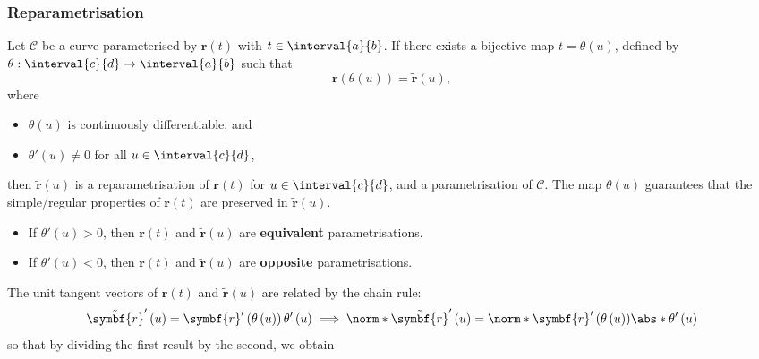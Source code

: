 \documentclass{article}
\begin{document}
\subsubsection{Reparametrisation}
Let \(\mathscr{C}\) be a curve parameterised by \(\symbf{r}\left( t
\right)\) with \(t \in \interval{a}{b}\). If there exists a bijective
map \(t = \theta\left( u \right)\), defined by \(\theta :
\interval{c}{d} \to \interval{a}{b}\) such that
\begin{equation*}
    \symbf{r}\left( \theta\left( u \right) \right) = \tilde{\symbf{r}}\left( u \right),
\end{equation*}
where
\begin{itemize}
    \item \(\theta\left( u \right)\) is continuously differentiable, and
    \item \(\theta'\left( u \right) \neq 0\) for all \(u \in \interval{c}{d}\),
\end{itemize}
then \(\tilde{\symbf{r}}\left( u \right)\) is a reparametrisation of
\(\symbf{r}\left( t \right)\) for \(u \in \interval{c}{d}\), and a
parametrisation of \(\mathscr{C}\). The map \(\theta\left( u \right)\)
guarantees that the simple/regular properties of \(\symbf{r}\left( t \right)\)
are preserved in \(\tilde{\symbf{r}}\left( u \right)\).
\begin{itemize}
    \item If \(\theta'\left( u \right) > 0\), then \(\symbf{r}\left( t
          \right)\) and \(\tilde{\symbf{r}}\left( u \right)\) are
          \textbf{equivalent} parametrisations.
    \item If \(\theta'\left( u \right) < 0\), then \(\symbf{r}\left( t
          \right)\) and \(\tilde{\symbf{r}}\left( u \right)\) are
          \textbf{opposite} parametrisations.
\end{itemize}
The unit tangent vectors of \(\symbf{r}\left( t \right)\) and
\(\tilde{\symbf{r}}\left( u \right)\) are related by the chain rule:
\begin{equation*}
    \tilde{\symbf{r}}'\left( u \right) = \symbf{r}'\left( \theta\left( u \right) \right) \theta'\left( u \right) \implies \norm*{\tilde{\symbf{r}}'\left( u \right)} = \norm*{\symbf{r}'\left( \theta\left( u \right) \right)} \abs*{\theta'\left( u \right)}
\end{equation*}
so that by dividing the first result by the second, we obtain
\end{document}
